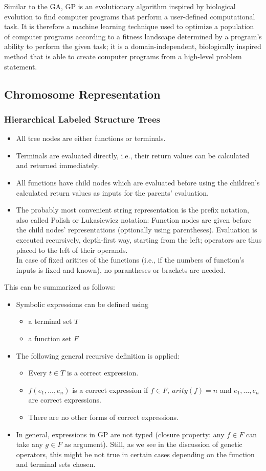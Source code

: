 \documentclass[12pt]{article}
\newcounter{subsubsubsection}[subsubsection]
\begin{document}
Similar to the GA, GP is an evolutionary algorithm inspired by biological evolution to find computer programs that perform a user-defined computational task. It is therefore a machine learning technique used to optimize a population of computer programs according to a fitness landscape determined by a program's ability to perform the given task; it is a domain-independent, biologically inspired method that is able to create computer programs from a high-level problem statement.
\subsection{Chromosome Representation}
\subsubsection{Hierarchical Labeled Structure Trees}
\begin{itemize}
\item All tree nodes are either functions or terminals.
\item Terminals are evaluated directly, i.e., their return values can be calculated and returned immediately.
\item All functions have child nodes which are evaluated before using the children's calculated return values as inputs for the parents' evaluation.
\item The probably most convenient string representation is the prefix notation, also called Polish or Lukasiewicz notation: Function nodes are given before the child nodes' representations (optionally using parentheses). Evaluation is executed recursively, depth-first way, starting from the left; operators are thus placed to the left of their operands.\\
In case of fixed aritites of the functions (i.e., if the numbers of function's inputs is fixed and known), no parantheses or brackets are needed.
\end{itemize}
This can be summarized as follows:
\begin{itemize}
\item Symbolic expressions can be defined using
\begin{itemize}
\item a terminal set $T$
\item a function set $F$
\end{itemize}
\item The following general recursive definition is applied:
\begin{itemize}
\item Every $t \in T$ is a correct expression.
\item $f(e_1,\dots,e_n)$ is a correct expression if $f \in F,\ arity(f) = n$ and $e_1,\dots,e_n$ are correct expressions.
\item There are no other forms of correct expressions.
\end{itemize}
\item In general, expressions in GP are not typed (closure property: any $f \in F$ can take any $g \in F$ as argument). Still, as we see in the discussion of genetic operators, this might be not true in certain cases depending on the function and terminal sets chosen.
\end{itemize}
\end{document}
